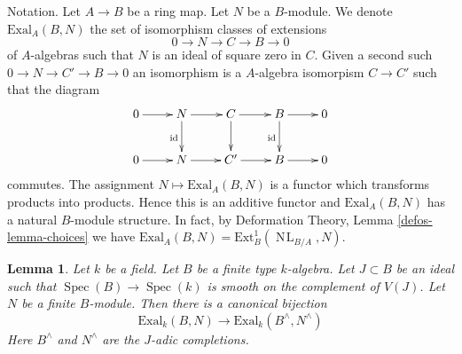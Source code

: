\documentclass{stacks-project}
\theoremstyle{plain}
\newtheorem{lemma}[subsection]{Lemma}
\theoremstyle{definition}
\theoremstyle{remark}
\numberwithin{equation}{subsection}
\def\Spec{\mathop{\mathrm{Spec}}}
\def\NL{\mathop{N\!L}\nolimits}
\begin{document}
\noindent
Notation. Let $A \to B$ be a ring map. Let $N$ be a $B$-module.
We denote $\text{Exal}_A(B, N)$ the set of isomorphism classes
of extensions
$$
0 \to N \to C \to B \to 0
$$
of $A$-algebras such that $N$ is an ideal of square zero in $C$.
Given a second such $0 \to N \to C' \to B \to 0$ an isomorphism
is a $A$-algebra isomorpism $C \to C'$ such that the diagram
$$
\xymatrix{
0 \ar[r] &
N \ar[r] \ar[d]_{\text{id}} &
C \ar[r] \ar[d] &
B \ar[r] \ar[d]_{\text{id}} & 0 \\
0 \ar[r] &
N \ar[r] &
C' \ar[r] &
B \ar[r] & 0
}
$$
commutes. The assignment $N \mapsto \text{Exal}_A(B, N)$
is a functor which transforms products into products.
Hence this is an additive functor and $\text{Exal}_A(B, N)$
has a natural $B$-module structure. In fact, by
Deformation Theory, Lemma \ref{defos-lemma-choices}
we have $\text{Exal}_A(B, N) = \text{Ext}^1_B(\NL_{B/A}, N)$.

\begin{lemma}
\label{lemma-first-order-completion}
Let $k$ be a field. Let $B$ be a finite type $k$-algebra.
Let $J \subset B$ be an ideal such that
$\Spec(B) \to \Spec(k)$ is smooth on the complement of $V(J)$.
Let $N$ be a finite $B$-module.
Then there is a canonical bijection
$$
\text{Exal}_k(B, N) \to \text{Exal}_k(B^\wedge, N^\wedge)
$$
Here $B^\wedge$ and $N^\wedge$ are the $J$-adic completions.
\end{lemma}
\end{document}
